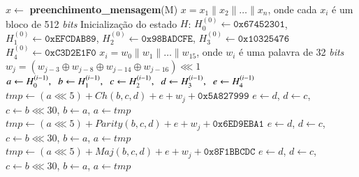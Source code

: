 \documentclass{SBCbookchapter}
\begin{document}
\begin{otherlanguage}{brazilian}
{\begin{algorithm}
\caption{O algoritmo SHA-1}
\begin{algorithmic}
	\State $x \leftarrow$ \textbf{preenchimento\_mensagem}(M)
	\State $x = x_1 \| x_2 \| \ldots \| x_n$, onde cada $x_i$ é um bloco de 512 \emph{bits}
	\State Inicialização do estado $H$: 	$H_0^{(0)} \leftarrow \texttt{0x67452301}$, \hspace{2mm} $H_1^{(0)} \leftarrow \texttt{0xEFCDAB89}$, 
	\State \hspace{2mm} $H_2^{(0)} \leftarrow \texttt{0x98BADCFE}$, \hspace{2mm} $H_3^{(0)} \leftarrow \texttt{0x10325476}$ \hspace{2mm} $H_4^{(0)} \leftarrow \texttt{0xC3D2E1F0}$
		\State $x_i = w_0\|w_1\|\ldots\|w_{15}$, onde $w_i$ é uma palavra de 32 \emph{bits}
			\State $w_j = (w_{j-3} \oplus w_{j-8} \oplus w_{j-14} \oplus w_{j-16}) \lll 1$
		\EndFor
		\State $a \leftarrow H_0^{(i-1)}, \hspace{2mm} b \leftarrow H_1^{(i-1)}, \hspace{2mm} c \leftarrow H_2^{(i-1)}, \hspace{2mm} d \leftarrow H_3^{(i-1)}, \hspace{2mm} e \leftarrow H_4^{(i-1)}$
			\State $tmp \leftarrow (a \lll 5) + Ch(b,c,d) + e + w_j + \texttt{0x5A827999}$
			\State $e \leftarrow d$, \hspace{2mm} $d \leftarrow c$, \hspace{2mm} $c \leftarrow b \lll 30$, \hspace{2mm} $b \leftarrow a$, \hspace{2mm} $a \leftarrow tmp$
		\EndFor
			\State $tmp \leftarrow (a \lll 5) + Parity(b,c,d) + e + w_j + \texttt{0x6ED9EBA1}$
			\State $e \leftarrow d$, \hspace{2mm} $d \leftarrow c$, \hspace{2mm} $c \leftarrow b \lll 30$, \hspace{2mm} $b \leftarrow a$, \hspace{2mm} $a \leftarrow tmp$
		\EndFor
			\State $tmp \leftarrow (a \lll 5) + Maj(b,c,d) + e + w_j + \texttt{0x8F1BBCDC}$
			\State $e \leftarrow d$, \hspace{2mm} $d \leftarrow c$, \hspace{2mm} $c \leftarrow b \lll 30$, \hspace{2mm} $b \leftarrow a$, \hspace{2mm} $a \leftarrow tmp$

\end{algorithmic}
\end{algorithm}}
\end{otherlanguage}
\end{document}

